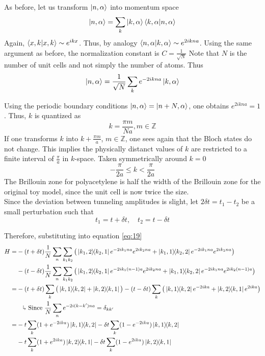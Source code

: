 \documentclass[12pt,a4paper,titlepage]{article}
\newcommand{\trm}[1]{\textrm{#1}} %
\newcommand{\explain}{\quad\rotatebox[origin=c]{180}{$\Lsh$}} %
\begin{document}
As before, let us transform $\ket{n,\alpha}$ into momentum space
\begin{equation}
\ket{n,\alpha}=\sum_{k}\ket{k,\alpha}\braket{k,\alpha}{n,\alpha}
\end{equation}
Again, $\braket{x,k}\sim e^{ikx}$. Thus, by analogy $\braket{n,\alpha}{k,\alpha}\sim e^{2ikna}$. Using the same argument as before, the normalization constant is $C=\frac{1}{\sqrt{N}}$ Note that $N$ is the number of unit cells and not simply the number of atoms. Thus
\begin{equation}
\ket{n,\alpha}=\frac{1}{\sqrt{N}}\sum_{k}e^{-2ikna}\ket{k,\alpha}
\end{equation}

Using the periodic boundary conditions $\ket{n,\alpha}=\ket{n+N,\alpha}$, one obtains $e^{2ikna}=1$. Thus, $k$ is quantized as
\begin{equation}
k=\frac{\pi m}{Na}, m\in\mathbb{Z}
\end{equation}
If one transforms $k$ into $k+\frac{\pi m}{a}$, $m\in\mathbb{Z}$, one sees again that the Bloch states do not change. This implies the physically distanct values of $k$ are restricted to a finite interval of $\frac{\pi}{a}$ in $k$-space. Taken symmetrically around $k=0$
\begin{equation}
-\frac{\pi}{2a}\leq k<\frac{\pi}{2a}
\end{equation}
The Brillouin zone for polyacetylene is half the width of the Brillouin zone for the original toy model, since the unit cell is now twice the size.\\

Since the deviation between tunneling amplitudes is slight, let $2\delta t=t_{1}-t_{2}$ be a small perturbation such that
\begin{equation}
t_{1}=t+\delta t, \quad t_{2}=t-\delta t
\end{equation}

Therefore, substituting into equation \eqref{eq:19}
\begin{equation}
\begin{aligned}
H=&-(t+\delta t)\frac{1}{N}\sum_{n}\sum_{k_{1}k_{2}}\big(\ketbra{k_{1},2}{k_{2},1}e^{-2ik_{1}na}e^{2ik_{2}na}+\ketbra{k_{1},1}{k_{2},2}e^{-2ik_{1}na}e^{2ik_{2}na}\big)\\
&-(t-\delta t)\frac{1}{N}\sum_{n}\sum_{k_{1}k_{2}}\big(\ketbra{k_{1},2}{k_{2},1}e^{-2ik_{1}(n-1)a}e^{2ik_{2}na}+\ketbra{k_{1},1}{k_{2},2}e^{-2ik_{1}na}e^{2ik_{2}(n-1)a}\big)\\
=&-(t+\delta t)\sum_{k}\big(\ketbra{k,1}{k,2}+\ketbra{k,2}{k,1}\big)-(t-\delta t)\sum_{k}\big(\ketbra{k,1}{k,2}e^{-2ika}+\ketbra{k,2}{k,1}e^{2ika}\big)\\
&\explain\trm{ Since } \frac{1}{N}\sum_{n}e^{-2i(k-k')na}=\delta_{kk'}\\
=&-t\sum_{k}(1+e^{-2ika})\ketbra{k,1}{k,2}-\delta t\sum_{k}(1-e^{-2ika})\ketbra{k,1}{k,2}\\
&-t\sum_{k}(1+e^{2ika})\ketbra{k,2}{k,1}-\delta t\sum_{k}(1-e^{2ika})\ketbra{k,2}{k,1}
\end{aligned}
\end{equation}
\end{document}
